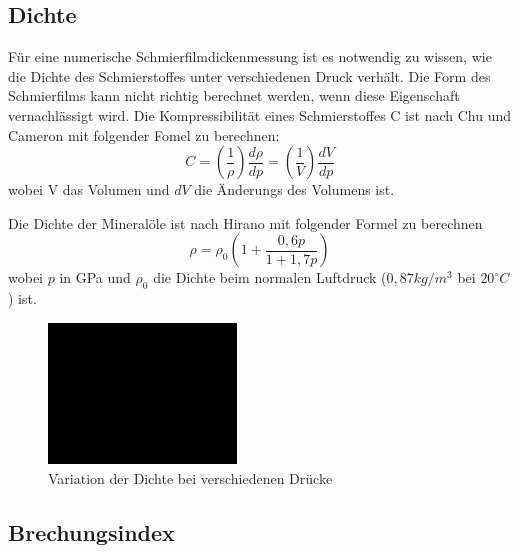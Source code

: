 \subsection*{Dichte}
\label{sub:dichte}

Für eine numerische Schmierfilmdickenmessung ist es notwendig zu wissen, wie die Dichte des Schmierstoffes unter verschiedenen Druck verhält.
Die Form des Schmierfilms kann nicht richtig berechnet werden, wenn diese Eigenschaft vernachlässigt wird.
Die Kompressibilität eines Schmierstoffes C ist nach Chu und Cameron mit folgender Fomel zu berechnen:
\begin{equation}
    \label{eq:kompressibilitaet}
    C = \left( \frac{1}{\rho} \right) \frac{d\rho}{dp} = \left( \frac{1}{V} \right) \frac{dV}{dp}
\end{equation}
%
wobei V das Volumen und $dV$ die Änderungs des Volumens ist.

Die Dichte der Mineralöle ist nach Hirano\cite{hirano} mit folgender Formel zu berechnen
\begin{equation}
    \label{eq:dichte_hirano}
    \rho = \rho_0 \left( 1 + \frac{0,6p}{1 + 1,7p} \right)
\end{equation}
%
wobei $p$ in GPa und $\rho_0$ die Dichte beim normalen Luftdruck ($0,87 kg/m^3$ bei $20^\circ C$) ist.
\begin{figure}[htb]
    \centering
    \includegraphics[width=5cm]{./images/blank_img.jpg}
    \caption{Variation der Dichte bei verschiedenen Drücke}
    \label{fig:variation_der_dichte_bei_verschiedenen_druecke}
\end{figure}

\subsection*{Brechungsindex}
\label{sub:brechungsindex}

